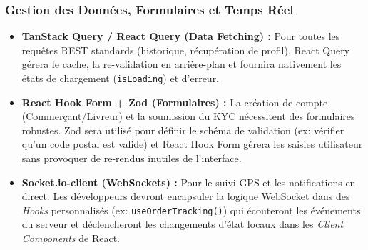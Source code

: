 \subsubsection{Gestion des Données, Formulaires et Temps Réel}
\begin{itemize}
    \item \textbf{TanStack Query / React Query (Data Fetching) :} Pour toutes les requêtes REST standards (historique, récupération de profil). React Query gérera le cache, la re-validation en arrière-plan et fournira nativement les états de chargement (\texttt{isLoading}) et d'erreur.
    \item \textbf{React Hook Form + Zod (Formulaires) :} La création de compte (Commerçant/Livreur) et la soumission du KYC nécessitent des formulaires robustes. Zod sera utilisé pour définir le schéma de validation (ex: vérifier qu'un code postal est valide) et React Hook Form gérera les saisies utilisateur sans provoquer de re-rendus inutiles de l'interface.
    \item \textbf{Socket.io-client (WebSockets) :} Pour le suivi GPS et les notifications en direct. Les développeurs devront encapsuler la logique WebSocket dans des \textit{Hooks} personnalisés (ex: \texttt{useOrderTracking()}) qui écouteront les événements du serveur et déclencheront les changements d'état locaux dans les \textit{Client Components} de React.
\end{itemize}